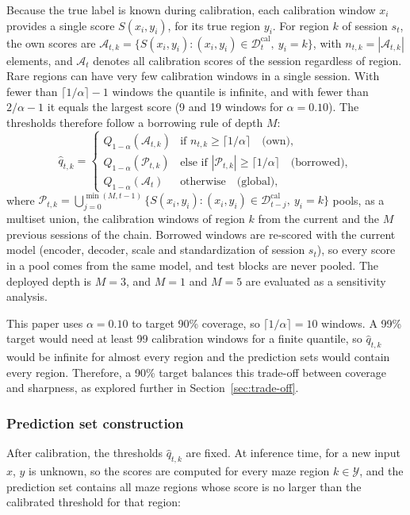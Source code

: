 \documentclass{article}
\begin{document}
Because the true label is known during calibration, each calibration window $x_i$ provides a single score $S(x_i,y_i)$, for its true region $y_i$. For region $k$ of session $s_t$, the own scores are $\mathcal{A}_{t,k}=\{S(x_i,y_i):(x_i,y_i)\in\mathcal{D}^{\mathrm{cal}}_t,\ y_i=k\}$, with $n_{t,k}=|\mathcal{A}_{t,k}|$ elements, and $\mathcal{A}_t$ denotes all calibration scores of the session regardless of region. Rare regions can have very few calibration windows in a single session. With fewer than $\lceil 1/\alpha\rceil-1$ windows the quantile is infinite, and with fewer than $2/\alpha-1$ it equals the largest score (9 and 19 windows for $\alpha=0.10$). The thresholds therefore follow a borrowing rule of depth $M$:
\begin{equation}
  \label{rule:borrow}
  \hat q_{t,k}=
  \begin{cases}
    Q_{1-\alpha}(\mathcal{A}_{t,k}) & \text{if } n_{t,k}\ge\lceil 1/\alpha\rceil \quad\text{(own)},\\[2pt]
    Q_{1-\alpha}(\mathcal{P}_{t,k}) & \text{else if } |\mathcal{P}_{t,k}|\ge\lceil 1/\alpha\rceil \quad\text{(borrowed)},\\[2pt]
    Q_{1-\alpha}(\mathcal{A}_t) & \text{otherwise} \quad\text{(global)},
  \end{cases}
\end{equation}
where $\mathcal{P}_{t,k}=\bigcup_{j=0}^{\min(M,t-1)}\{S(x_i,y_i):(x_i,y_i)\in\mathcal{D}^{\mathrm{cal}}_{t-j},\ y_i=k\}$ pools, as a multiset union, the calibration windows of region $k$ from the current and the $M$ previous sessions of the chain. Borrowed windows are re-scored with the current model (encoder, decoder, scale and standardization of session $s_t$), so every score in a pool comes from the same model, and test blocks are never pooled. The deployed depth is $M=3$, and $M=1$ and $M=5$ are evaluated as a sensitivity analysis.

This paper uses $\alpha=0.10$ to target 90\% coverage, so $\lceil 1/\alpha\rceil=10$ windows. A 99\% target would need at least 99 calibration windows for a finite quantile, so $\hat q_{t,k}$ would be infinite for almost every region and the prediction sets would contain every region. Therefore, a 90\% target balances this trade-off between coverage and sharpness, as explored further in Section~\ref{sec:trade-off}.

\subsubsection{Prediction set construction}
After calibration, the thresholds $\hat q_{t,k}$ are fixed. At inference time, for a new input $x$, $y$ is unknown, so the scores are computed for every maze region $k\in\mathcal{Y}$, and the prediction set contains all maze regions whose score is no larger than the calibrated threshold for that region:
\end{document}
